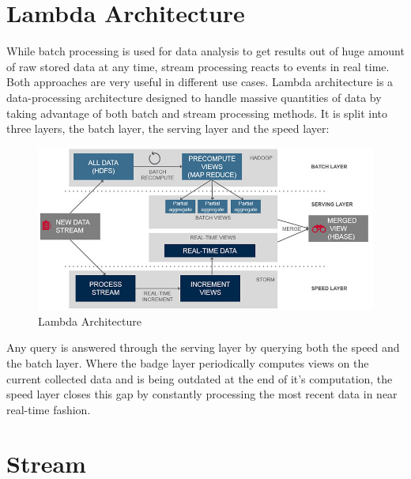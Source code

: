 \section{Lambda Architecture}
While batch processing is used for data analysis to get results out of huge
amount of raw stored data at any time, stream processing reacts to events in
real time. Both approaches are very useful in different use cases. Lambda
architecture is a data-processing architecture designed to handle massive
quantities of data by taking advantage of both batch and stream processing
methods. It is split into three layers, the batch layer, the serving layer and
the speed layer:

\begin{figure}[H]
    \centering
    \includegraphics[width=1.0\textwidth]{images/lambda-architecture.jpg}
    \caption{Lambda Architecture}
    \label{fig:lambda-Architecture}
\end{figure}

Any query is answered through the serving layer by querying both the speed and
the batch layer. Where the badge layer periodically computes views on the
current collected data and is being outdated at the end of it's computation, the
speed layer closes this gap by constantly processing the most recent data in
near real-time fashion. \cite{marz2015big} \cite{PrpSvyOfDSPS}

\section{Stream}
